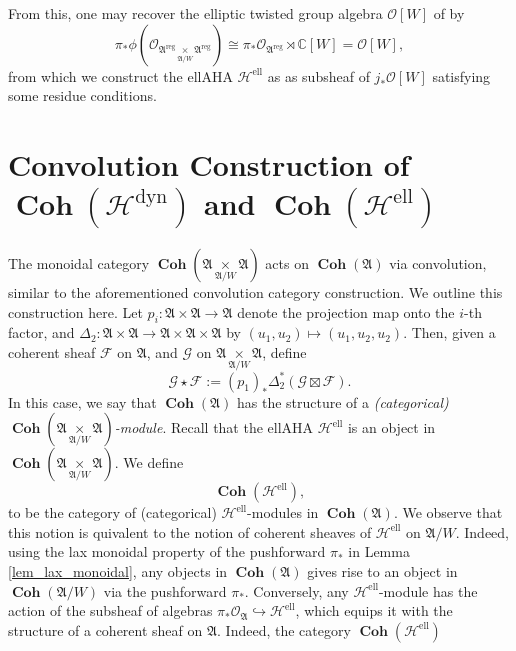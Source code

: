 \documentclass[a4paper]{report}
\theoremstyle{theorem}
\theoremstyle{definition}
\theoremstyle{remark}
\theoremstyle{proposition}
\theoremstyle{conjecture}
\theoremstyle{lemma}
\theoremstyle{corollary}
\theoremstyle{exercise}
\theoremstyle{example}
\newcommand{\C}{\mathbb{C}}
\newcommand{\mcal}{\mathcal}
\newcommand{\on}{\operatorname}
\newcommand{\coh}{\on{\mathbf{Coh}}}
\newcommand{\dyn}{{\on{dyn}}}
\begin{document}
  From this, one may recover the elliptic twisted group algebra 
  $\mcal{O}[W]$ of \cite{gkv95} by 
  $$\pi_\ast \phi(\mcal{O}_{\mathfrak{A}^{\on{reg}} \underset{\mathfrak{A}/W}{\times} \mathfrak{A}^{\on{reg}}}) \cong \pi_\ast \mcal{O}_{\mathfrak{A}^{\on{reg}}} \rtimes \C[W] = \mcal{O}[W],$$
  from which we construct the ellAHA $\mcal{H}^{\on{ell}}$ 
  as as subsheaf of $j_\ast \mcal{O}[W]$ satisfying some residue 
  conditions.
  
  \section{Convolution Construction of $\coh(\mcal{H}^\dyn)$ and $\coh(\mcal{H}^{\on{ell}})$}
  
  The monoidal category $\coh(\mathfrak{A} \underset{\mathfrak{A}/W}{\times} \mathfrak{A})$
  acts on $\coh(\mathfrak{A})$ via convolution, similar to the aforementioned 
  convolution category construction. We outline this construction here.
  Let $p_i : \mathfrak{A} \times \mathfrak{A} \to \mathfrak{A}$ 
  denote the projection map onto the $i$-th factor, and 
  $\Delta_2 : \mathfrak{A} \times \mathfrak{A} \to \mathfrak{A} \times \mathfrak{A} \times \mathfrak{A}$ by $(u_1,u_2) \mapsto (u_1,u_2,u_2)$. 
  Then, given a coherent sheaf $\mcal{F}$ on $\mathfrak{A}$, and 
  $\mcal{G}$ on $\mathfrak{A} \underset{\mathfrak{A}/W}{\times} \mathfrak{A}$, 
  define $$\mcal{G} \star \mcal{F} := (p_1)_\ast \Delta_2^\ast \left(\mcal{G} \boxtimes \mcal{F}\right).$$
  In this case, we say that $\coh(\mathfrak{A})$ has the structure of a 
  \emph{(categorical) $\coh(\mathfrak{A}\underset{\mathfrak{A}/W}{\times} \mathfrak{A})$-module}.
  Recall that the ellAHA $\mcal{H}^{\on{ell}}$ is an object in 
  $\coh(\mathfrak{A}\underset{\mathfrak{A}/W}{\times}\mathfrak{A})$. We define 
  $$\coh(\mcal{H}^{\on{ell}}),$$ to be the category of 
  (categorical) $\mcal{H}^{\on{ell}}$-modules in $\coh(\mathfrak{A})$.
  We observe that this notion is quivalent to the notion of coherent sheaves of 
  $\mcal{H}^{\on{ell}}$ on $\mathfrak{A}/W$. Indeed, using the 
  lax monoidal property of the pushforward $\pi_\ast$ in Lemma \ref{lem_lax_monoidal}, any objects in $\coh(\mathfrak{A})$ gives rise to an object in
  $\coh(\mathfrak{A}/W)$ via the pushforward $\pi_\ast$. Conversely,
  any $\mcal{H}^{\on{ell}}$-module has the action of the 
  subsheaf of algebras $\pi_\ast\mcal{O}_{\mathfrak{A}} \hookrightarrow \mcal{H}^{\on{ell}}$, which equips it with the structure of a coherent 
  sheaf on $\mathfrak{A}$. Indeed, the category $\coh(\mcal{H}^{\on{ell}})$
\end{document}
